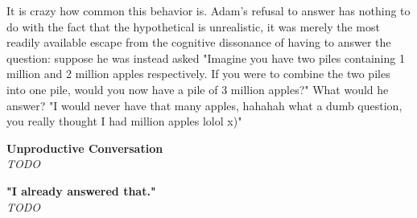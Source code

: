 It is crazy how common this behavior is. Adam's refusal to answer has nothing to do with the fact that the hypothetical is unrealistic, it was merely the most readily available escape from the cognitive dissonance of having to answer the question: suppose he was instead asked "Imagine you have two piles containing 1 million and 2 million apples respectively. If you were to combine the two piles into one pile, would you now have a pile of 3 million apples?" What would he answer? "I would never have that many apples, hahahah what a dumb question, you really thought I had million apples lolol x)" 

\par
\textbf{Unproductive Conversation}\\
\textit{TODO}

\par
\textbf{"I already answered that."}\\
\textit{TODO}

